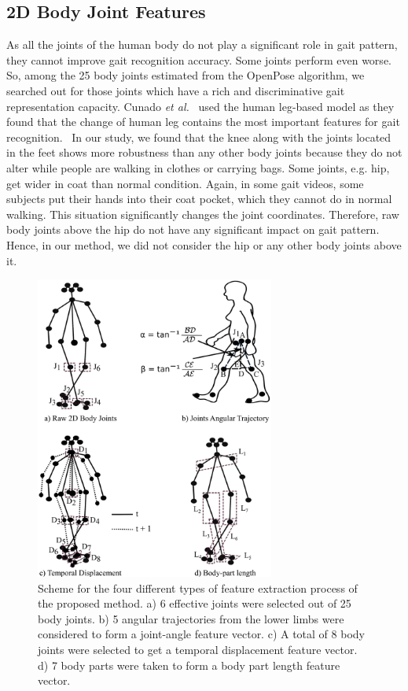 \subsection{2D Body Joint Features}
As all the joints of the human body do not play a significant role in gait pattern, they cannot improve gait recognition accuracy. Some joints perform even worse. So, among the 25 body joints estimated from the OpenPose algorithm, we searched out for those joints which have a rich and discriminative gait representation capacity. Cunado \textit{et al.}~\cite{Cunado_97} used the human leg-based model as they found that the change of human leg contains the most important features for gait recognition.  In our study, we found that the knee along with the joints located in the feet shows more robustness than any other body joints because they do not alter while people are walking in clothes or carrying bags. Some joints, e.g. hip, get wider in coat than normal condition. Again, in some gait videos, some subjects put their hands into their coat pocket, which they cannot do in normal walking. This situation significantly changes the joint coordinates. Therefore, raw body joints above the hip do not have any significant impact on gait pattern. Hence, in our method, we did not consider the hip or any other body joints above it.



\begin{figure}
	\centering 
	\includegraphics[width = 0.7\textwidth]{figures/extracted_features.eps}
	\caption[Scheme for the four different types of feature extraction process of the proposed method]
	{Scheme for the four different types of feature extraction process of the proposed method. a) 6 effective joints were selected out of 25 body joints. b) 5 angular trajectories from the lower limbs were considered to form a joint-angle feature vector. c) A total of 8 body joints were selected to get a temporal displacement feature vector. d) 7 body parts were taken to form a body part length feature vector.\label{fig:extracted_features}
	}
\end{figure}

